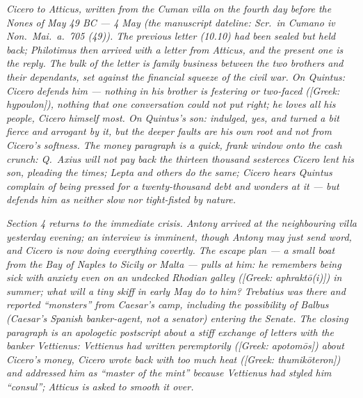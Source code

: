 
\textit{Cicero to Atticus, written from the Cuman villa
on the fourth day before the Nones of May 49 BC --- 4
May (the manuscript dateline: \textit{Scr.\ in Cumano iv
Non.\ Mai.\ a.\ 705 (49)}). The previous letter (10.10)
had been sealed but held back; Philotimus then arrived
with a letter from Atticus, and the present one is the
reply. The bulk of the letter is family business between
the two brothers and their dependants, set against the
financial squeeze of the civil war. On Quintus: Cicero
defends him --- nothing in his brother is festering or
two-faced (\textit{[Greek: hypoulon]}), nothing that one
conversation could not put right; he loves all his
people, Cicero himself most. On Quintus's son: indulged,
yes, and turned a bit fierce and arrogant by it, but the
deeper faults are his own root and not from Cicero's
softness. The money paragraph is a quick, frank window
onto the cash crunch: Q.~Axius will not pay back the
thirteen thousand sesterces Cicero lent his son,
pleading the times; Lepta and others do the same;
Cicero hears Quintus complain of being pressed for a
twenty-thousand debt and wonders at it --- but defends
him as neither slow nor tight-fisted by nature.}

\textit{Section 4 returns to the immediate crisis.
Antony arrived at the neighbouring villa yesterday
evening; an interview is imminent, though Antony may
just send word, and Cicero is now doing everything
covertly. The escape plan --- a small boat from the Bay
of Naples to Sicily or Malta --- pulls at him: he
remembers being sick with anxiety even on an undecked
Rhodian galley (\textit{[Greek: aphrakt\=o(i)]}) in
summer; what will a tiny skiff in early May do to him?
Trebatius was there and reported ``monsters'' from
Caesar's camp, including the possibility of Balbus
(Caesar's Spanish banker-agent, not a senator) entering
the Senate. The closing paragraph is an apologetic
postscript about a stiff exchange of letters with the
banker Vettienus: Vettienus had written peremptorily
(\textit{[Greek: apotom\=os]}) about Cicero's money,
Cicero wrote back with too much heat
(\textit{[Greek: thumik\=oteron]}) and addressed him as
``master of the mint'' because Vettienus had styled him
``consul''; Atticus is asked to smooth it over.}
